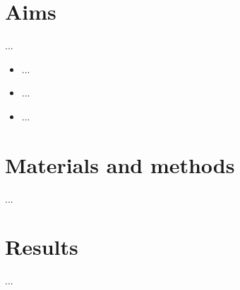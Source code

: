 \documentclass[a4paper, 12pt, epic, carom]{article}
\begin{document}
\newpage

%

\section{Aims}
...
\begin{itemize}
	\item ...
	\item ...
	\item ...
\end{itemize}

\newpage

%
%

\section{Materials and methods}
...



\newpage

%
%

\newpage

\section{Results}
...








\newpage



%
%
%
\end{document}
